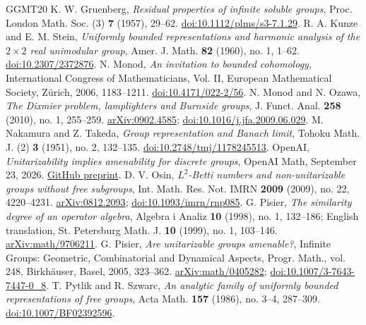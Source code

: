 \documentclass[a4paper,11pt]{amsproc}
\numberwithin{equation}{section}
\theoremstyle{definition}
\begin{document}
\begin{thebibliography}{GGMT20}
 K. W. Gruenberg, \emph{Residual properties of infinite soluble groups}, Proc. London Math. Soc. (3) \textbf{7} (1957), 29--62. \href{https://doi.org/10.1112/plms/s3-7.1.29}{doi:10.1112/plms/s3-7.1.29}.
 R. A. Kunze and E. M. Stein, \emph{Uniformly bounded representations and harmonic analysis of the $2\times2$ real unimodular group}, Amer. J. Math. \textbf{82} (1960), no. 1, 1--62. \href{https://doi.org/10.2307/2372876}{doi:10.2307/2372876}.
 N. Monod, \emph{An invitation to bounded cohomology}, International Congress of Mathematicians, Vol. II, European Mathematical Society, Z\"urich, 2006, 1183--1211. \href{https://doi.org/10.4171/022-2/56}{doi:10.4171/022-2/56}.
 N. Monod and N. Ozawa, \emph{The Dixmier problem, lamplighters and Burnside groups}, J. Funct. Anal. \textbf{258} (2010), no. 1, 255--259. \href{https://arxiv.org/abs/0902.4585}{arXiv:0902.4585}; \href{https://doi.org/10.1016/j.jfa.2009.06.029}{doi:10.1016/j.jfa.2009.06.029}.
 M. Nakamura and Z. Takeda, \emph{Group representation and Banach limit}, Tohoku Math. J. (2) \textbf{3} (1951), no. 2, 132--135. \href{https://doi.org/10.2748/tmj/1178245513}{doi:10.2748/tmj/1178245513}.
 OpenAI, \emph{Unitarizability implies amenability for discrete groups}, OpenAI Math, September 23, 2026. \href{https://github.com/openai/math/blob/main/preprints/Unitarizability-Implies-Amenability-for-Countable-Groups-September-23-2026/paper.pdf}{GitHub preprint}.
 D. V. Osin, \emph{$L^2$-Betti numbers and non-unitarizable groups without free subgroups}, Int. Math. Res. Not. IMRN \textbf{2009} (2009), no. 22, 4220--4231. \href{https://arxiv.org/abs/0812.2093}{arXiv:0812.2093}; \href{https://doi.org/10.1093/imrn/rnp085}{doi:10.1093/imrn/rnp085}.
 G. Pisier, \emph{The similarity degree of an operator algebra}, Algebra i Analiz \textbf{10} (1998), no. 1, 132--186; English translation, St. Petersburg Math. J. \textbf{10} (1999), no. 1, 103--146. \href{https://arxiv.org/abs/math/9706211}{arXiv:math/9706211}.
 G. Pisier, \emph{Are unitarizable groups amenable?}, Infinite Groups: Geometric, Combinatorial and Dynamical Aspects, Progr. Math., vol. 248, Birkh\"auser, Basel, 2005, 323--362. \href{https://arxiv.org/abs/math/0405282}{arXiv:math/0405282}; \href{https://doi.org/10.1007/3-7643-7447-0_8}{doi:10.1007/3-7643-7447-0\_8}.
 T. Pytlik and R. Szwarc, \emph{An analytic family of uniformly bounded representations of free groups}, Acta Math. \textbf{157} (1986), no. 3--4, 287--309. \href{https://doi.org/10.1007/BF02392596}{doi:10.1007/BF02392596}.

\end{thebibliography}
\end{document}
